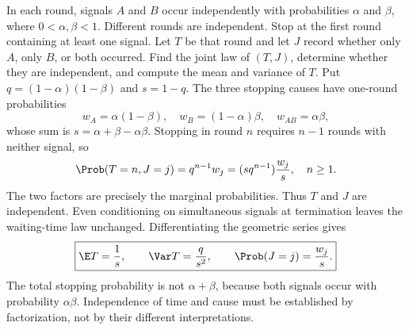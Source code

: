 In each round, signals $A$ and $B$ occur independently with probabilities $\alpha$ and $\beta$, where $0<\alpha,\beta<1$. Different rounds are independent. Stop at the first round containing at least one signal. Let $T$ be that round and let $J$ record whether only $A$, only $B$, or both occurred. Find the joint law of $(T,J)$, determine whether they are independent, and compute the mean and variance of $T$.
\solution Put $q=(1-\alpha)(1-\beta)$ and $s=1-q$. The three stopping causes have one-round probabilities
\[
w_A=\alpha(1-\beta),\quad w_B=(1-\alpha)\beta,
\quad w_{AB}=\alpha\beta,
\]
whose sum is $s=\alpha+\beta-\alpha\beta$. Stopping in round $n$ requires $n-1$ rounds with neither signal, so
\[
\Prob(T=n,J=j)=q^{n-1}w_j
=(s q^{n-1})\frac{w_j}{s},\quad n\ge1.
\]
The two factors are precisely the marginal probabilities. Thus $T$ and $J$ are independent. Even conditioning on simultaneous signals at termination leaves the waiting-time law unchanged. Differentiating the geometric series gives
\[
\boxed{\E T=\frac1s,\qquad \Var T=\frac q{s^2},
\qquad \Prob(J=j)=\frac{w_j}{s}.}
\]
\pitfall The total stopping probability is not $\alpha+\beta$, because both signals occur with probability $\alpha\beta$. Independence of time and cause must be established by factorization, not by their different interpretations.
